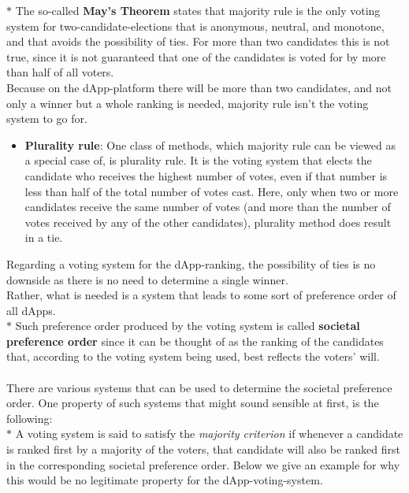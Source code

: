 \noindent $\bm{\ast}$ The so-called \textbf{May's Theorem} states that majority rule %
is the only voting system for two-candidate-elections that is anonymous, neutral, and monotone, and that avoids the possibility of ties. For more than two candidates this is not true, since it is not guaranteed that one of the candidates is voted for by more than half of all voters. \\
Because on the dApp-platform there will be more than two candidates, and not only a winner but a whole ranking is needed, majority rule isn't the voting system to go for.

\begin{itemize}[leftmargin = 0pt]
\item {\textbf{Plurality rule}}: One class of methods, which majority rule can be viewed as a special case of, is plurality rule. It is the voting system that elects the candidate who receives the highest number of votes, even if that number is less than half of the total number of votes cast. Here, only when two or more candidates receive the same number of votes (and more than the number of votes received by any of the other candidates), plurality method does result in a tie.
\end{itemize}
Regarding a voting system for the dApp-ranking, the possibility of ties is no downside as there is no need to determine a single winner.\\ %
Rather, what is needed is a system that leads to some sort of preference order of all dApps. \\
\noindent $\bm{\ast}$ Such preference order produced by the voting system is called {\textbf{societal preference order}} since it can be thought of as the ranking of the candidates that, according to the voting system being used, best reflects the voters' will. \\ \\
There are various systems that can be used to determine the societal preference order. One property of such systems that might sound sensible at first, is the following: \\
\noindent $\bm{\ast}$ A voting system is said to satisfy the {\textit{majority criterion}} if whenever a candidate is ranked first by a majority of the voters, that candidate will also be ranked first in the corresponding societal preference order. Below we give an example for why this would be no legitimate property for the dApp-voting-system.\\
